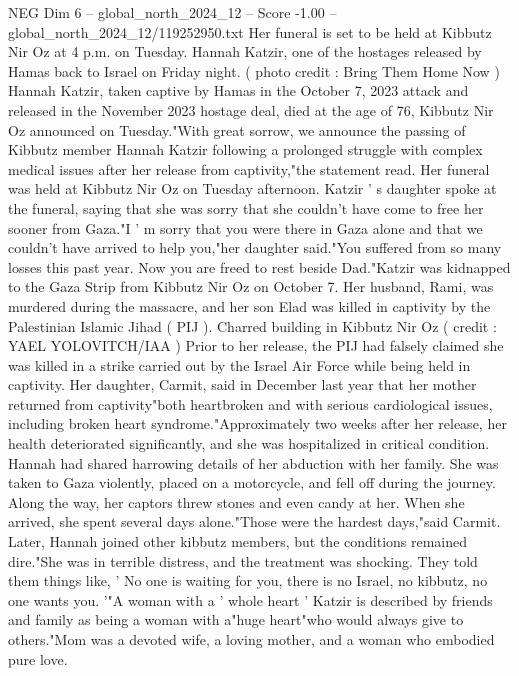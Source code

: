 \begin{textsample}{NEG Dim 6 – global\_north\_2024\_12 – Score -1.00 – global\_north\_2024\_12/119252950.txt}  \label{ex:f6_neg_176}
Her funeral is set to be held at Kibbutz Nir Oz at 4 p.m. on Tuesday.
Hannah Katzir, one of the hostages released by Hamas back to Israel on Friday night. ( photo credit : Bring Them Home Now ) Hannah Katzir, taken captive by Hamas in the October 7, 2023 attack and released in the November 2023 hostage deal, died at the age of 76, Kibbutz Nir Oz announced on Tuesday."With great sorrow, we announce the passing of Kibbutz member Hannah Katzir following a prolonged struggle with complex medical issues after her release from captivity,"the statement read.
Her funeral was held at Kibbutz Nir Oz on Tuesday afternoon.
Katzir ' s daughter spoke at the funeral, saying that she was sorry that she couldn't have come to free her sooner from Gaza."I ' m sorry that you were there in Gaza alone and that we couldn't have arrived to help you,"her daughter said."You suffered from so many losses this past year.
Now you are freed to rest beside Dad."Katzir was kidnapped to the Gaza Strip from Kibbutz Nir Oz on October 7.
Her husband, Rami, was murdered during the massacre, and her son Elad was killed in captivity by the Palestinian Islamic Jihad ( PIJ ).
Charred building in Kibbutz Nir Oz ( credit : YAEL YOLOVITCH/IAA ) Prior to her release, the PIJ had falsely claimed she was killed in a strike carried out by the Israel Air Force while being held in captivity.
Her daughter, Carmit, said in December last year that her mother returned from captivity"both heartbroken and with serious cardiological issues, including broken heart syndrome."Approximately two weeks after her release, her health deteriorated significantly, and she was hospitalized in critical condition.
Hannah had shared harrowing details of her abduction with her family.
She was taken to Gaza violently, placed on a motorcycle, and fell off during the journey.
Along the way, her captors threw stones and even candy at her.
When she arrived, she spent several days alone."Those were the hardest days,"said Carmit.
Later, Hannah joined other kibbutz members, but the conditions remained dire."She was in terrible distress, and the treatment was shocking.
They told them things like, ' No one is waiting for you, there is no Israel, no kibbutz, no one wants you. '"A woman with a ' whole heart ' Katzir is described by friends and family as being a woman with a"huge heart"who would always give to others."Mom was a devoted wife, a loving mother, and a woman who embodied pure love.

\end{textsample}
